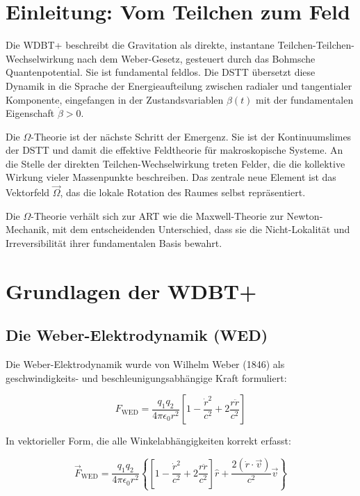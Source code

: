 \documentclass[12pt,a4paper]{article}
\begin{document}
\tableofcontents

\newpage

\section{Einleitung: Vom Teilchen zum Feld}

Die WDBT+ beschreibt die Gravitation als direkte, instantane Teilchen-Teilchen-\\Wechselwirkung nach dem Weber-Gesetz, gesteuert durch das Bohmsche Quantenpotential. Sie ist
fundamental feldlos. Die DSTT übersetzt diese Dynamik in die Sprache der Energieaufteilung zwischen radialer und tangentialer Komponente, eingefangen in der Zustandsvariablen
$\beta(t)$ mit der fundamentalen Eigenschaft $\dot{\beta} > 0$.

Die $\Omega$-Theorie ist der nächste Schritt der Emergenz. Sie ist der Kontinuumslimes der DSTT und damit die effektive Feldtheorie für makroskopische Systeme. An die Stelle der
direkten Teilchen-Wechselwirkung treten Felder, die die kollektive Wirkung vieler Massenpunkte beschreiben. Das zentrale neue Element ist das Vektorfeld $\vec{\Omega}$, das die
lokale Rotation des Raumes selbst repräsentiert.

Die $\Omega$-Theorie verhält sich zur ART wie die Maxwell-Theorie zur Newton-Mechanik, mit dem entscheidenden Unterschied, dass sie die Nicht-Lokalität und Irreversibilität ihrer
fundamentalen Basis bewahrt.

\section{Grundlagen der WDBT+}

\subsection{Die Weber-Elektrodynamik (WED)}

Die Weber-Elektrodynamik wurde von Wilhelm Weber (1846) als geschwindigkeits- und beschleunigungsabhängige Kraft formuliert:

\begin{equation}
F_{\text{WED}} = \frac{q_1 q_2}{4 \pi \epsilon_0 r^2} \left[ 1 - \frac{\dot{r}^2}{c^2} + 2 \frac{r \ddot{r}}{c^2} \right]
\end{equation}

In vektorieller Form, die alle Winkelabhängigkeiten korrekt erfasst:

\begin{equation}
\vec{F}_{\text{WED}} = \frac{q_1 q_2}{4\pi\epsilon_0 r^2} \left\{ \left[ 1 - \frac{\dot{r}^2}{c^2} + 2 \frac{r\ddot{r}}{c^2} \right] \hat{r} + \frac{2(\dot{r} \cdot \vec{v})}{c^2} \vec{v} \right\}
\end{equation}
\end{document}
